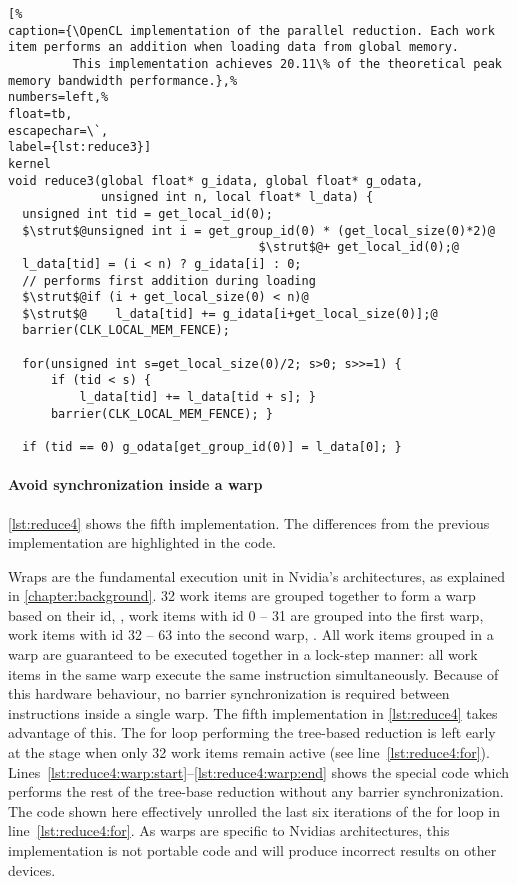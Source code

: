 \begin{lstlisting}[%                                                             
caption={\OpenCL implementation of the parallel reduction. Each work item performs an addition when loading data from global memory.
         This implementation achieves 20.11\% of the theoretical peak memory bandwidth performance.},%
numbers=left,%
float=tb,
escapechar=\`,
label={lst:reduce3}]
kernel
void reduce3(global float* g_idata, global float* g_odata,
             unsigned int n, local float* l_data) {
  unsigned int tid = get_local_id(0);
  $\strut$@unsigned int i = get_group_id(0) * (get_local_size(0)*2)@
                                   $\strut$@+ get_local_id(0);@
  l_data[tid] = (i < n) ? g_idata[i] : 0;
  // performs first addition during loading
  $\strut$@if (i + get_local_size(0) < n)@
  $\strut$@    l_data[tid] += g_idata[i+get_local_size(0)];@
  barrier(CLK_LOCAL_MEM_FENCE);

  for(unsigned int s=get_local_size(0)/2; s>0; s>>=1) {
      if (tid < s) {
          l_data[tid] += l_data[tid + s]; }
      barrier(CLK_LOCAL_MEM_FENCE); }

  if (tid == 0) g_odata[get_group_id(0)] = l_data[0]; }
\end{lstlisting}

\newpage

\paragraph{Avoid synchronization inside a warp}

\autoref{lst:reduce4} shows the fifth implementation.
The differences from the previous implementation are highlighted in the code.

Wraps are the fundamental execution unit in Nvidia's \GPU architectures, as explained in \autoref{chapter:background}.
32 work items are grouped together to form a warp based on their id, \ie, work items with id 0 -- 31 are grouped into the first warp, work items with id 32 -- 63 into the second warp, \etc.
All work items grouped in a warp are guaranteed to be executed together in a lock-step manner:
all work items in the same warp execute the same instruction simultaneously.
Because of this hardware behaviour, no barrier synchronization is required between instructions inside a single warp.
The fifth implementation in \autoref{lst:reduce4} takes advantage of this.
The for loop performing the tree-based reduction is left early at the stage when only 32 work items remain active (see line~\ref{lst:reduce4:for}).
Lines~\ref{lst:reduce4:warp:start}--\ref{lst:reduce4:warp:end} shows the special code which performs the rest of the tree-base reduction without any barrier synchronization.
The code shown here effectively unrolled the last six iterations of the for loop in line~\ref{lst:reduce4:for}.
As warps are specific to Nvidias \GPU architectures, this implementation is not portable \OpenCL code and will produce incorrect results on other \OpenCL devices.

